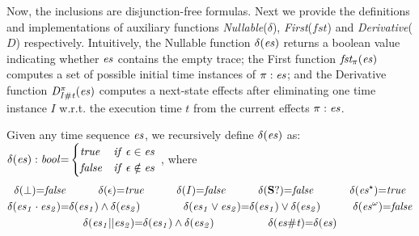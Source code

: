 \documentclass[acmsmall,10pt,review]{acmart}
\newcommand{\es}{\textcolor{black}{\ensuremath{{es}}}}
\newcommand\pure[1]{ \textcolor{black}{#1}}
\newcommand{\seq}{\cdot}
\newcommand{\choice}{\vee}
\newcommand{\code}[1]{{\tt{\ensuremath{\m{#1}}}}}
\newcommand{\esn}[2]{\ensuremath{#1^{#2}}}
\newcommand{\empt}{\textcolor{black}{\ensuremath{\epsilon}}}
\newcommand{\bott}{\textcolor{black}{\ensuremath{\bot}}}
\newcommand{\m}{\mathit}
\begin{document}
Now, the inclusions are disjunction-free formulas. 
Next we provide the definitions and implementations of auxiliary functions \emph{Nullable}(\code{\delta}), \emph{First}(\code{fst}) and \emph{Derivative}(\code{D}) respectively.
Intuitively, the Nullable function \code{\delta(\es)} returns a boolean value indicating whether \code{\es} contains the empty trace; the First function \code{fst_{\pure{\pi}}( \es)} computes a set of possible initial time instances of \code{\pure{\pi} : \es}; and the Derivative function \code{D_{I\# t}^{\pure{\pi}}(\es)} computes a next-state effects after eliminating one time instance \code{I} w.r.t. the execution time \code{t} from the current effects \code{\pure{\pi} : \es}. 



%




\begin{definition}[Nullable]\label{Nullable}
Given any time sequence \code{\es}, we recursively define \code{\delta(\es)} as:\\
{
\code{\delta(\es) :bool {=}
\begin{cases}
      \code{true} & \code{if\ \empt \in \es}\\
      \code{false} & \code{if\ \empt \notin \es}
    \end{cases} }
    }, where   
{ 
\begin{gather*}
\code{\delta(\bott) {=} false} 
\qquad\quad
\code{\delta(\empt) {=} true} 
\qquad\quad
\code{\delta(I){=} false}   
\qquad\quad
\code{\delta(\textbf{S}?){=} false}   
\qquad\quad\
    \code{\delta(\esn{\es}{\star} ) {=} true}   
\\ 
\code{\delta(\es_1 \seq \es_2) {=} \delta(\es_1) \wedge \delta(\es_2)}
\qquad\qquad
  \code{\delta(\es_1 \choice \es_2) {=} \delta(\es_1) \vee \delta(\es_2)}   
  \qquad\quad
  \code{\delta(\esn{\es}{\omega} ) {=} false}     
  \\
\code{\delta(\es_1 || \es_2) {=} \delta(\es_1) \wedge \delta(\es_2)}
\qquad\qquad\quad
 \code{\delta(\es \# t) {=} \delta(\es)}
\end{gather*}}
\end{definition}
\end{document}
